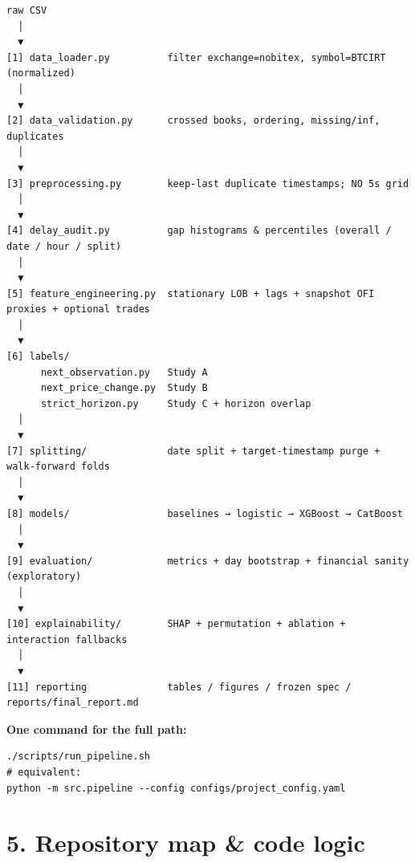 \documentclass[11pt,a4paper]{article}
\begin{document}
\begin{verbatim}
raw CSV
  │
  ▼
[1] data_loader.py          filter exchange=nobitex, symbol=BTCIRT (normalized)
  │
  ▼
[2] data_validation.py      crossed books, ordering, missing/inf, duplicates
  │
  ▼
[3] preprocessing.py        keep-last duplicate timestamps; NO 5s grid
  │
  ▼
[4] delay_audit.py          gap histograms & percentiles (overall / date / hour / split)
  │
  ▼
[5] feature_engineering.py  stationary LOB + lags + snapshot OFI proxies + optional trades
  │
  ▼
[6] labels/
      next_observation.py   Study A
      next_price_change.py  Study B
      strict_horizon.py     Study C + horizon overlap
  │
  ▼
[7] splitting/              date split + target-timestamp purge + walk-forward folds
  │
  ▼
[8] models/                 baselines → logistic → XGBoost → CatBoost
  │
  ▼
[9] evaluation/             metrics + day bootstrap + financial sanity (exploratory)
  │
  ▼
[10] explainability/        SHAP + permutation + ablation + interaction fallbacks
  │
  ▼
[11] reporting              tables / figures / frozen spec / reports/final_report.md
\end{verbatim}

\textbf{One command for the full path:}


\begin{verbatim}
./scripts/run_pipeline.sh
# equivalent:
python -m src.pipeline --config configs/project_config.yaml
\end{verbatim}

\vspace{0.5em}

\section{5. Repository map \& code logic}
\end{document}
